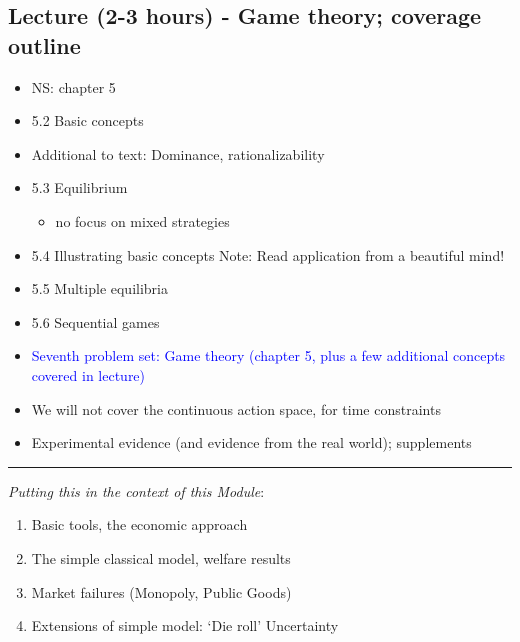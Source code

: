 \documentclass[]{article}
\providecommand{\tightlist}{%
  \setlength{\itemsep}{0pt}\setlength{\parskip}{0pt}}
\begin{document}
\hypertarget{lecture-2-3-hours---game-theory-coverage-outline}{%
\subsection{Lecture (2-3 hours) - Game theory; coverage
outline}\label{lecture-2-3-hours---game-theory-coverage-outline}}

\begin{itemize}
\item
  NS: chapter 5
\item
  5.2 Basic concepts
\item
  Additional to text: Dominance, rationalizability
\item
  5.3 Equilibrium

  \begin{itemize}
  \tightlist
  \item
    no focus on mixed strategies
  \end{itemize}
\item
  5.4 Illustrating basic concepts Note: Read application from a
  beautiful mind!
\item
  5.5 Multiple equilibria
\item
  5.6 Sequential games
\item
  \textcolor{blue}{Seventh problem set: Game theory (chapter 5, plus a few additional concepts covered in lecture)}
\end{itemize}

\begin{itemize}
\tightlist
\item
  We will not cover the continuous action space, for time constraints
\end{itemize}

\begin{itemize}
\tightlist
\item
  Experimental evidence (and evidence from the real world); supplements
\end{itemize}

\begin{center}\rule{0.5\linewidth}{\linethickness}\end{center}

\bigskip

\emph{Putting this in the context of this Module}:

\begin{enumerate}
\def\labelenumi{\arabic{enumi}.}
\item
  Basic tools, the economic approach
\item
  The simple classical model, welfare results
\item
  Market failures (Monopoly, Public Goods)
\item
  Extensions of simple model: `Die roll' Uncertainty
\end{enumerate}
\end{document}
